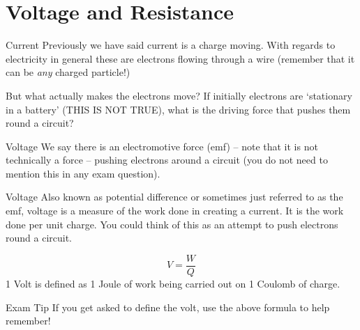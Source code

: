 \documentclass[../Main.tex]{subfiles}
\begin{document}
\author{Voltage and Resistance} %
\date{Year 1 Topic 11} %

\section{Voltage and Resistance} %

\begin{frame}{Current}
    Previously we have said current is a charge moving. With regards to electricity in general these are electrons flowing through a wire (remember that it can be \emph{any} charged particle!)
    \newline
    
    But what actually makes the electrons move? If initially electrons are `stationary in a battery' (THIS IS NOT TRUE), what is the driving force that pushes them round a circuit?
\end{frame}

\begin{frame}{Voltage}
    We say there is an electromotive force (emf) -- note that it is not technically a force -- pushing electrons around a circuit (you do not need to mention this in any exam question).
    
    \begin{block}{Voltage}
Also known as potential difference or sometimes just referred to as the emf, voltage is a measure of the work done in creating a current. It is the work done per unit charge. You could think of this as an attempt to push electrons round a circuit.
    \end{block}
    
    \begin{equation*}
        V = \frac{W}{Q}
    \end{equation*}
     1 Volt is defined as 1 Joule of work being carried out on 1 Coulomb of charge.
    \begin{exampleblock}{Exam Tip}
    If you get asked to define the volt, use the above formula to help remember!
    \end{exampleblock}
\end{frame}
\end{document}
